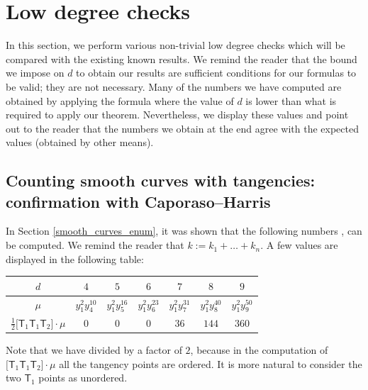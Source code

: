 \documentclass[pdftex]{sigma}
\numberwithin{equation}{section}
\begin{document}
\section{Low degree checks}\label{verification}

In this section, we perform various non-trivial low degree checks which will be compared with the existing known results.
We remind the reader that the bound we impose on $d$ to obtain our results are sufficient
conditions for our formulas to be valid; they are not necessary.
Many of the numbers we have computed are obtained by applying the formula where the value of $d$
is lower than what is required to apply our theorem. Nevertheless, we display these values
and point out to the reader that the numbers we obtain at the end agree with the expected values
(obtained by other means).

\subsection[Counting smooth curves with tangencies: confirmation with Caporaso-Harris]{Counting smooth curves with tangencies:\\ confirmation with Caporaso--Harris}

In Section \ref{smooth_curves_enum}, it was shown that the following numbers
,
can be computed. We remind the reader that $k:= k_1+\dots + k_n$.
A few values are displayed in the following table:
\begin{center}\renewcommand{\arraystretch}{1.2}
\begin{tabular}{|c|c|c|c|c|c|c|}
\hline
$d$ &$4$ &$5$ & $6$ & $7$ & $8$ & $9$ \\
\hline
$\mu$ &$y_1^2 y_4^{10}$ &$y_1^2 y_5^{16}$ & $y_1^2 y_6^{23}$ & $y_1^2 y_7^{31}$ & $y_1^2 y_8^{40}$ & $y_1^2 y_9^{50}$ \\
\hline
$\frac{1}{2}\bigl[\mathsf{T}_{1} \mathsf{T}_{1} \mathsf{T}_{2}\bigr] \cdot \mu$
& $0$ & $0$ & $0$ & $36$ & $144$ & $360$ \\
\hline
\end{tabular}
\label{IRCAA_tab}
\end{center}
Note that we have divided by a factor of $2$, because in the computation of
$\bigl[\mathsf{T}_{1} \mathsf{T}_{1} \mathsf{T}_{2}\bigr] \cdot \mu$ all the tangency points are ordered.
It is more natural to consider the two $\mathsf{T}_1$ points as unordered.
\end{document}
